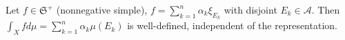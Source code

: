 Let $f \in \mathfrak{S}^+$ (nonnegative simple), $f = \sum_{k=1}^{n} \alpha_k \xi_{E_k}$ with disjoint $E_k \in \mathcal{A}$. Then $\int_X f d\mu = \sum_{k=1}^{n} \alpha_k \mu(E_k)$ is well-defined, independent of the representation.
